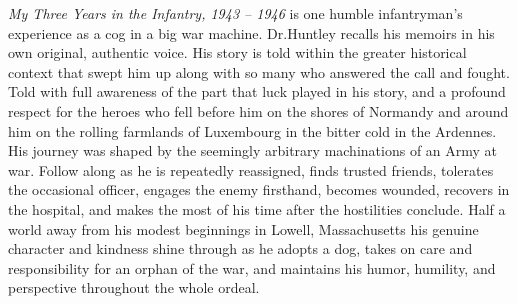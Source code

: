 {
    \fontsize{14}{17}
    \emph{My Three Years in the Infantry, 1943 -- 1946} is one humble infantryman's experience as a cog in
    a big war machine. Dr.\@ Huntley recalls his memoirs in his own original, authentic voice. His story is
    told within the greater historical context that swept him up along with so many who answered the call
    and fought. Told with full awareness of the part that luck played in his story, and a profound
    respect for the heroes who fell before him on the shores of Normandy and around him on the rolling
    farmlands of Luxembourg in the bitter cold in the Ardennes.\\

    His journey was shaped by the seemingly arbitrary machinations of an Army at war. Follow along as
    he is repeatedly reassigned, finds trusted friends, tolerates the occasional officer,
    engages the enemy firsthand, becomes wounded, recovers in the hospital, and makes the most
    of his time after the hostilities conclude. Half a world away from his modest beginnings in Lowell,
    Massachusetts his genuine character and kindness shine through as he adopts a dog, takes on care and
    responsibility for an orphan of the war, and maintains his humor, humility, and perspective throughout
    the whole ordeal.\\
}

